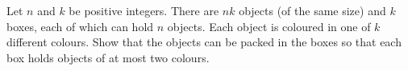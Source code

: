 Let $n$ and $k$ be positive integers. There are $nk$ objects (of the same size) and $k$ boxes, each of which can hold $n$ objects. Each object is coloured in one of $k$ different colours. Show that the objects can be packed in the boxes so that each box holds objects of at most two colours.